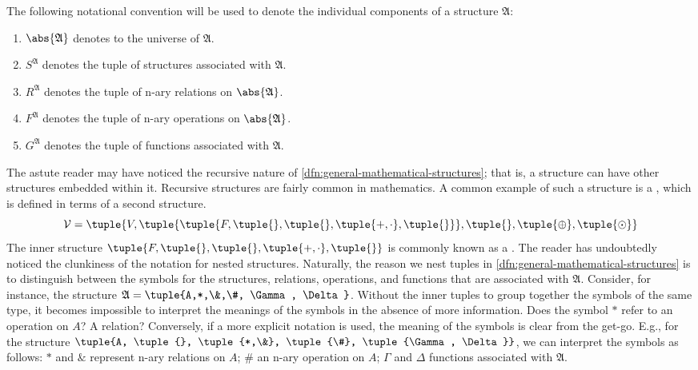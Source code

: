 \begin{notation}
     \label{notation:individual-components-of-mathematical-structures}
    The following notational convention will be used
    to denote the individual components of a structure \( \mathfrak{A} \):
    \begin{enumerate}[topsep=2pt,noitemsep,label=\textup{\texttt{(\alph*)}}]
        \item \( \abs{\mathfrak{A}} \) denotes to the universe of \( \mathfrak{A} \).
        \item \( S^{\mathfrak{A}} \) denotes the tuple of structures associated with \( \mathfrak{A} \).
        \item \( R^{\mathfrak{A}} \) denotes the tuple of n-ary relations on \( \abs{\mathfrak{A}} \).
        \item \( F^{\mathfrak{A}} \) denotes the tuple of n-ary operations on \( \abs{\mathfrak{A}} \).
        \item \( G^{\mathfrak{A}} \) denotes the tuple of functions associated with \( \mathfrak{A} \).
    \end{enumerate}
\end{notation}

\vspace{0.1cm}
\noindent
The astute reader may have noticed the recursive nature of \cref{dfn:general-mathematical-structures}; that is, a structure can have other structures embedded within it.
Recursive structures are fairly common in mathematics. A common example of such a structure is a ,
which is defined in terms of a second structure.
\begin{equation*}
    \mathcal{V} = \tuple{V, \tuple{\tuple{F, \tuple{}, \tuple{}, \tuple{+, \cdot}, \tuple{}}}, \tuple{}, \tuple{\oplus}, \tuple{\odot} }
\end{equation*}
The inner structure \( \tuple{F, \tuple{}, \tuple{}, \tuple{+, \cdot}, \tuple{}} \) is commonly known as a .
The reader has undoubtedly noticed the clunkiness of the notation for nested structures.
Naturally, the reason we nest tuples
in \cref{dfn:general-mathematical-structures} is to distinguish between the symbols for the structures, relations, operations, and functions
that are associated with \( \mathfrak{A} \).
Consider, for instance, the structure \( \mathfrak{A} = \tuple{A,*,\&,\#, \Gamma, \Delta} \).
Without the inner tuples to group together the symbols of the same type, it becomes impossible
to interpret the meanings of the symbols in the absence of more information.
Does the symbol \( * \) refer to an operation on \( A \)? A relation?
Conversely, if a more explicit notation is used,
the meaning of the symbols is clear from the get-go.
E.g., for the structure \( \tuple{A, \tuple{}, \tuple{*,\&}, \tuple{\#}, \tuple{\Gamma, \Delta}} \),
we can interpret the symbols as follows:
\( * \) and \( \& \) represent n-ary relations on \( A \);
\( \# \) an n-ary operation on \( A \);
\( \Gamma \) and \( \Delta \) functions associated with \( \mathfrak{A} \).

